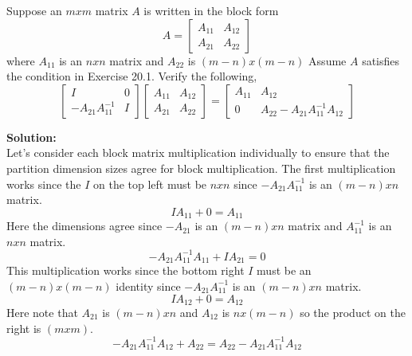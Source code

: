 \documentclass[12pt]{article}
\makeatletter
\theoremstyle{homework}
\newenvironment{exercise}[1]
{\def\@currentlabel{#1}\exercisecore}
{\endexercisecore}
\newcommand{\localhead}[1]{\par\smallskip\noindent\textbf{#1}\nobreak\\}%
\newcommand\solution{\localhead{Solution:}}
\makeatother
\begin{document}
\begin{exercise}{20.1(a)}Suppose an $mxm$ matrix $A$ is written in the block form 
  \begin{equation*}
    A = \begin{bmatrix}
      A_{11} & A_{12}\\
      A_{21} & A_{22}
    \end{bmatrix}
  \end{equation*}
  where $A_{11}$ is an $nxn$ matrix and $A_{22}$ is $(m-n)x(m-n)$ Assume $A$ satisfies the condition in Exercise 20.1. Verify the following, 
  \begin{equation*}
    \begin{bmatrix}
      I & 0 \\
      -A_{21}A^{-1}_{11} & I
    \end{bmatrix}
    \begin{bmatrix}
      A_{11} & A_{12}\\
      A_{21} & A_{22}
    \end{bmatrix}
     = 
     \begin{bmatrix}
       A_{11} & A_{12}\\
       0 & A_{22} - A_{21}A^{-1}_{11}A_{12}
     \end{bmatrix}
  \end{equation*}
  \solution Let's consider each block matrix multiplication individually to ensure that the partition dimension sizes agree for block multiplication. The first multiplication 
  works since the $I$ on the top left must be $nxn$ since $-A_{21}A^{-1}_{11}$ is an $(m - n)xn$ matrix. 
  \begin{equation*}
    IA_{11} + 0 = A_{11}
  \end{equation*}
  Here the dimensions agree since  $-A_{21}$ is an $(m - n)xn$ matrix and  $A^{-1}_{11}$ is an $nxn$ matrix. 
  \begin{equation*}
    -A_{21}A^{-1}_{11}A_{11} + IA_{21} = 0
  \end{equation*}
  This multiplication works since the bottom right $I$ must be an $(m-n)x(m-n)$ identity since $-A_{21}A^{-1}_{11}$ is an $(m - n)xn$ matrix. 
  \begin{equation*}
    IA_{12} + 0 = A_{12}
  \end{equation*}
  Here note that $A_{21}$ is $(m - n)xn$ and $A_{12}$ is $nx(m - n)$ so the product on the right is $(mxm)$. 
  \begin{equation*}
    -A_{21}A^{-1}_{11}A_{12} + A_{22} = A_{22}-A_{21}A^{-1}_{11}A_{12}
  \end{equation*}
\end{exercise}
\end{document}
